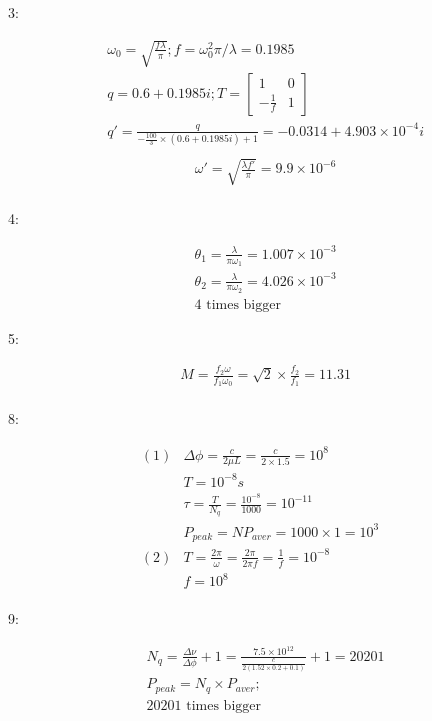 \documentclass{article}
\begin{document}
3:

\begin{align*}
&\omega_0=\sqrt{\frac{f\lambda}\pi};f=\omega_0^2\pi/\lambda=0.1985\\
&q=0.6+0.1985i;T=\begin{bmatrix}1&0\\-\frac1f&1\end{bmatrix}\\
&q'=\frac{q}{-\frac{100}3 \times(0.6+0.1985i)+1}=-0.0314+4.903 \times 10^{-4}i\\
\end{align*}
\begin{align*}
&\omega'=\sqrt{\frac{\lambda f'}\pi}=9.9 \times 10^{-6}\\
\end{align*}

4:

\begin{align*}
&\theta_1=\frac{\lambda}{\pi\omega_1}=1.007 \times 10^{-3}\\
&\theta_2=\frac{\lambda}{\pi\omega_2}=4.026 \times 10^{-3}\\
&\text{4 times bigger}
\end{align*}

5:

\begin{align*}
&M=\frac{f_2\omega}{f_1\omega_0}=\sqrt{2} \times \frac{f_2}{ f_1}=11.31\\
\end{align*}

8:

\begin{align*}
  (1)&\Delta\phi=\frac{c}{2\mu L}=\frac{c}{2 \times 1.5}=10^8\\
     &T=10^{-8}s\\
     &\tau=\frac{T}{N_q}=\frac{10^{-8}}{1000}=10^{-11}\\
     &P_{peak}=NP_{aver}=1000 \times 1=10^3\\
  (2)&T=\frac{2\pi}{\omega}=\frac{2\pi}{2\pi f}=\frac1f=10^{-8}\\
     &f=10^8\\
\end{align*}

9:

\begin{align*}
&N_q=\frac{\Delta\nu}{\Delta\phi}+1=\frac{7.5 \times 10^{12}}{\frac{c}{2(1.52 \times 0.2+0.1)}}+1=20201\\
&P_{peak}=N_q \times P_{aver};\\
&\text{20201 times bigger}
\end{align*}
\end{document}
